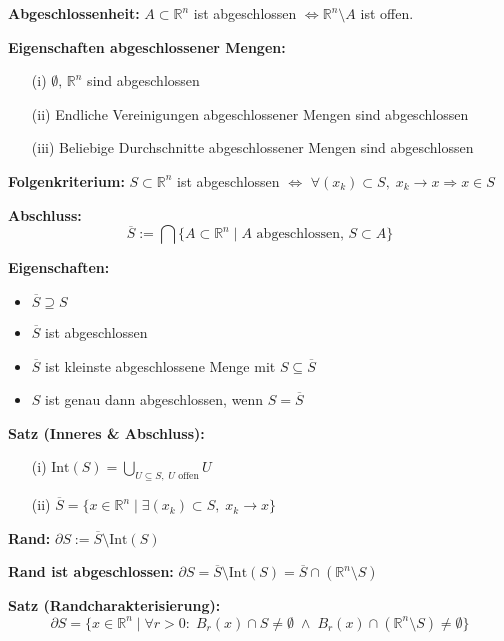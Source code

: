 \begin{itemize}
\textbf{Abgeschlossenheit:}  
\(A \subset \mathbb{R}^n\) ist abgeschlossen \(\Leftrightarrow \mathbb{R}^n \setminus A\) ist offen.

\textbf{Eigenschaften abgeschlossener Mengen:}
\begin{itemize}
  \item[(i)] \(\emptyset,\, \mathbb{R}^n\) sind abgeschlossen
  \item[(ii)] Endliche Vereinigungen abgeschlossener Mengen sind abgeschlossen
  \item[(iii)] Beliebige Durchschnitte abgeschlossener Mengen sind abgeschlossen
\end{itemize}

\textbf{Folgenkriterium:}  
\(S \subset \mathbb{R}^n\) ist abgeschlossen \(\Leftrightarrow\)  
\(\forall (x_k) \subset S,\; x_k \to x \Rightarrow x \in S\)

\textbf{Abschluss:}  
\[
\overline{S} := \bigcap \{A \subset \mathbb{R}^n \mid A \text{ abgeschlossen, } S \subset A\}
\]

\textbf{Eigenschaften:}
\begin{itemize}
  \item \(\overline{S} \supseteq S\)
  \item \(\overline{S}\) ist abgeschlossen
  \item \(\overline{S}\) ist kleinste abgeschlossene Menge mit \(S \subseteq \overline{S}\)
  \item \(S\) ist genau dann abgeschlossen, wenn \(S = \overline{S}\)
\end{itemize}

\textbf{Satz (Inneres \& Abschluss):}
\begin{itemize}
  \item[(i)] \(\displaystyle \text{Int}(S) = \bigcup_{U \subseteq S,\; U \text{ offen}} U\)
  \item[(ii)] \(\displaystyle \overline{S} = \{x \in \mathbb{R}^n \mid \exists (x_k) \subset S,\; x_k \to x\}\)
\end{itemize}

\textbf{Rand:}  
\(\partial S := \overline{S} \setminus \text{Int}(S)\)

\textbf{Rand ist abgeschlossen:}  
\(\partial S = \overline{S} \setminus \text{Int}(S) = \overline{S} \cap (\mathbb{R}^n \setminus S)\)

\textbf{Satz (Randcharakterisierung):}  
\[
\partial S = \{x \in \mathbb{R}^n \mid \forall r > 0:\; B_r(x) \cap S \ne \emptyset \;\land\; B_r(x) \cap (\mathbb{R}^n \setminus S) \ne \emptyset \}
\]



\end{itemize}
